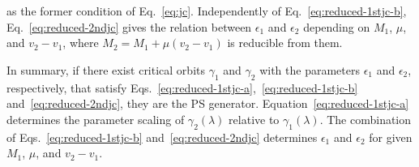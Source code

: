 \documentclass[prd,showpacs,preprintnumbers,groupedaddress,superscriptaddress,nofootinbib,11pt]{revtex4-1} %
\theoremstyle{newplain}
\begin{document}
as the former condition of Eq.~\eqref{eq:jc}.
Independently of Eq.~\eqref{eq:reduced-1stjc-b}, Eq.~\eqref{eq:reduced-2ndjc} gives the relation between $\epsilon_1$ and $\epsilon_2$ depending on $M_1$, $\mu$, and $v_2-v_1$, where $M_2=M_1+\mu(v_2-v_1)$ is reducible from them.
\par
In summary, if there exist critical orbits $\gamma_1$ and $\gamma_2$ with the parameters $\epsilon_1$ and $\epsilon_2$, respectively, that satisfy Eqs.~\eqref{eq:reduced-1stjc-a},~\eqref{eq:reduced-1stjc-b} and~\eqref{eq:reduced-2ndjc}, they are the PS generator.
Equation~\eqref{eq:reduced-1stjc-a} determines the parameter scaling of $\gamma_2(\lambda)$ relative to $\gamma_1(\lambda)$.
The combination of Eqs.~\eqref{eq:reduced-1stjc-b} and~\eqref{eq:reduced-2ndjc} determines $\epsilon_1$ and $\epsilon_2$ for given $M_1$, $\mu$, and $v_2-v_1$.

\end{document}
